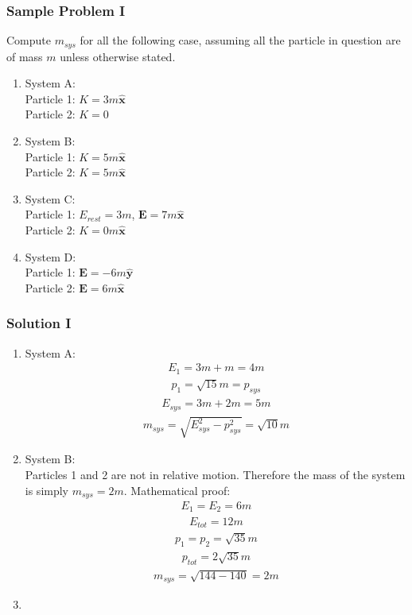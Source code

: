 \documentclass[11pt,letterpaper]{book}
\begin{document}
\subsubsection{Sample Problem I}
Compute $m_{sys}$ for all the following case, assuming all the particle in question are of mass $m$ unless otherwise stated.
\begin{enumerate}
    \item System A: \\
    Particle 1: \(K = 3m \hat{\textbf{x}}\)\\
    Particle 2: \(K = 0\)
    \item System B:\\
    Particle 1: \(K = 5m \hat{\textbf{x}}\)\\
    Particle 2: \(K = 5m \hat{\textbf{x}}\)
    \item System C:\\
    Particle 1: \(E_{rest} = 3m\), \(\textbf{E} = 7m \hat{\textbf{x}}\)\\
    Particle 2: \(K = 0m \hat{\textbf{x}}\)
    \item System D:\\
    Particle 1: \(\textbf{E}=-6m\hat{\textbf{y}}\)\\
    Particle 2: \(\textbf{E}=6m\hat{\textbf{x}}\)
\end{enumerate}
\subsubsection{Solution I}
\begin{enumerate}
    \item System A:
    \begin{align}
    E_1 = 3m + m = 4m\end{align}
    \begin{align}
    p_1 = \sqrt{15}m = p_{sys}
    \end{align}
    \begin{align}
    E_{sys} = 3m + 2m = 5m
    \end{align}
    \begin{align}
    m_{sys} = \sqrt{E_{sys}^2-p_{sys}^2}=\sqrt{10}m
    \end{align}
    \item System B:\\
    Particles 1 and 2 are not in relative motion. Therefore the mass of the system is simply $m_{sys} = 2m$. Mathematical proof:
    \begin{align}
    E_1 = E_2 = 6m
    \end{align}
    \begin{align}
    E_{tot}=12m
    \end{align}
    \begin{align}
    p_1 = p_2 = \sqrt{35}m
    \end{align}
    \begin{align}
    p_{tot}=2\sqrt{35}m
    \end{align}
    \begin{align}
    m_{sys} = \sqrt{144 - 140} = 2m
    \end{align}
    \item 
\end{enumerate}
\end{document}
